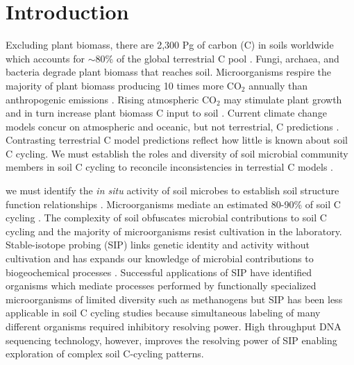 \section{Introduction}
Excluding plant biomass, there are 2,300 Pg of carbon (C) in soils
worldwide which accounts for $\sim$80\% of the global terrestrial C pool
\citep{Amundson_2001,BATJES_1996}. Fungi, archaea, and bacteria degrade plant
biomass that reaches soil. Microorganisms respire the majority of plant biomass
producing 10 times more CO$_{2}$ annually than anthropogenic emissions
\citep{chapin2002principles}. Rising atmospheric CO$_{2}$ may stimulate
plant growth and in turn increase plant biomass C input to soil
\citep{Groenigen_2006}. Current climate change models concur on
atmospheric and oceanic, but not terrestrial, C predictions
\citep{Friedlingstein_2006}. Contrasting terrestrial C model predictions
reflect how little is known about soil C cycling. We must establish the roles
and diversity of soil microbial community members in soil C cycling to
reconcile inconsistencies in terrestial C models
\citep{Neff_2001,McGuire2010a}.

we must identify the \textit{in situ} activity of soil microbes to establish
soil structure function relationships  \citep{O_Donnell_2002}. Microorganisms
mediate an estimated 80-90\% of soil C cycling
\citep{ColemanCrossley_1996,Nannipieri_2003}. The complexity of soil obfuscates
microbial contributions to soil C cycling and the majority of microorganisms
resist cultivation in the laboratory. Stable-isotope probing (SIP) links
genetic identity and activity without cultivation and has expands our knowledge
of microbial contributions to biogeochemical processes
\citep{Chen_Murrell_2010}. Successful applications of SIP have identified
organisms which mediate processes performed by functionally specialized
microorganisms of limited diversity such as methanogens \citep{Lu_2005} but SIP
has been less applicable in soil C cycling studies because simultaneous
labeling of many different organisms required inhibitory resolving power. High
throughput DNA sequencing technology, however, improves the resolving power of
SIP enabling exploration of complex soil C-cycling patterns.

